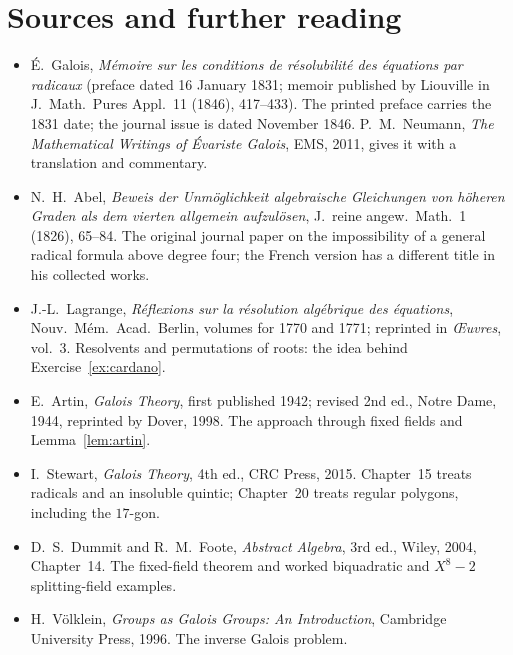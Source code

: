\section*{Sources and further reading}

\begin{itemize}
\item \'E.~Galois, \emph{Mémoire sur les conditions de résolubilité des équations par radicaux} (preface dated 16 January 1831; memoir published by Liouville in J.\ Math.\ Pures Appl.\ 11 (1846), 417--433). The printed preface carries the 1831 date; the journal issue is dated November 1846. P.~M.~Neumann, \emph{The Mathematical Writings of Évariste Galois}, EMS, 2011, gives it with a translation and commentary.
\item N.~H.~Abel, \emph{Beweis der Unmöglichkeit algebraische Gleichungen von höheren Graden als dem vierten allgemein aufzulösen}, J.\ reine angew.\ Math.\ 1 (1826), 65--84. The original journal paper on the impossibility of a general radical formula above degree four; the French version has a different title in his collected works.
\item J.-L.~Lagrange, \emph{Réflexions sur la résolution algébrique des équations}, Nouv.\ Mém.\ Acad.\ Berlin, volumes for 1770 and 1771; reprinted in \emph{Œuvres}, vol.~3. Resolvents and permutations of roots: the idea behind Exercise~\ref{ex:cardano}.
\item E.~Artin, \emph{Galois Theory}, first published 1942; revised 2nd ed., Notre Dame, 1944, reprinted by Dover, 1998. The approach through fixed fields and Lemma~\ref{lem:artin}.
\item I.~Stewart, \emph{Galois Theory}, 4th ed., CRC Press, 2015. Chapter~15 treats radicals and an insoluble quintic; Chapter~20 treats regular polygons, including the $17$-gon.
\item D.~S.~Dummit and R.~M.~Foote, \emph{Abstract Algebra}, 3rd ed., Wiley, 2004, Chapter~14. The fixed-field theorem and worked biquadratic and $X^8-2$ splitting-field examples.
\item H.~Völklein, \emph{Groups as Galois Groups: An Introduction}, Cambridge University Press, 1996. The inverse Galois problem.
\end{itemize}
